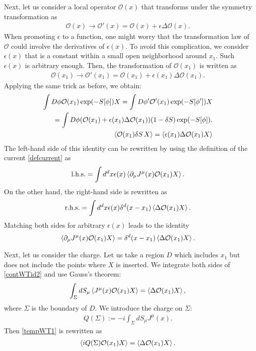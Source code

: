 \documentclass[12pt]{scrartcl}
\newcommand{\del}{\partial}
\newcommand{\Ocal}{\mathcal{O}}
\begin{document}
Next, let us consider a local operator $\Ocal(x)$ that transforms under the symmetry transformation as
\begin{align}
    \Ocal(x)\to \Ocal'(x)=\Ocal(x)+\epsilon \Delta \Ocal(x).
\end{align}
When promoting $\epsilon$ to a function, one might worry that the transformation law of $\Ocal$ could involve the derivatives of $\epsilon(x)$.
To avoid this complication, we consider $\epsilon(x)$ that is a constant within a small open neighborhood around $x_1$.  Such $\epsilon(x)$ is arbitrary enough.  Then, the transformation of $\Ocal(x_1)$ is written as
\begin{align}
    \Ocal(x_1)\to \Ocal'(x_1)=\Ocal(x_1)+\epsilon(x_1) \Delta \Ocal(x_1).
\end{align}
Applying the same trick as before, we obtain:
\begin{align}
    \int D\phi \Ocal(x_1)\exp(-S[\phi])X
    =\int D\phi' \Ocal'(x_1)\exp(-S[\phi'])X\nonumber\\
    =\int D\phi (\Ocal(x_1)+\epsilon(x_1)\Delta \Ocal(x_1))(1-\delta S)\exp(-S[\phi]).\nonumber\\
    \expval{\Ocal(x_1)\delta S\, X}
    =\expval{\epsilon(x_1)\Delta \Ocal(x_1)X} \label{tempWT0}
\end{align}
The left-hand side of this identity can be rewritten by using the definition of the current \eqref{defcurrent} as
\begin{align}
    \mathrm{l.h.s.}=\int d^dx \epsilon(x)\expval{\del_{\mu}J^{\mu}(x)\Ocal(x_1)X}.
\end{align}
On the other hand, the right-hand side is rewritten as
\begin{align}
    \mathrm{r.h.s.}=\int d^dx \epsilon(x)\delta^d(x-x_1)\expval{\Delta \Ocal(x_1)X}.
\end{align}
Matching both sides for arbitrary $\epsilon(x)$ leads to the identity
\begin{align}
    \expval{\del_{\mu}J^{\mu}(x) \Ocal(x_1)X}=\delta^d(x-x_1)\expval{\Delta \Ocal(x_1)X}.
    \label{contWTid2}
\end{align}

Next, let us consider the charge.  Let us take a region $D$ which includes $x_1$ but does not include the points where $X$ is inserted. We integrate both sides of \eqref{contWTid2} and use Gauss's theorem:
\begin{align}
    \int_{\Sigma}dS_{\mu}\expval{J^{\mu}(x)\Ocal(x_1)X}=\expval{\Delta \Ocal(x_1)X},\label{tempWT1}
\end{align}
where $\Sigma$ is the boundary of $D$.  We introduce the charge on $\Sigma$:
\begin{align}
    Q(\Sigma):=-i\int_{\Sigma}dS_{\mu} J^{\mu}(x).\label{charge}
\end{align}
Then \eqref{tempWT1} is rewritten as
\begin{align}
    \expval{iQ(\Sigma)\Ocal(x_1)X}=
    \expval{\Delta \Ocal(x_1)X}.
    \label{tempWT2}
\end{align}
\end{document}
